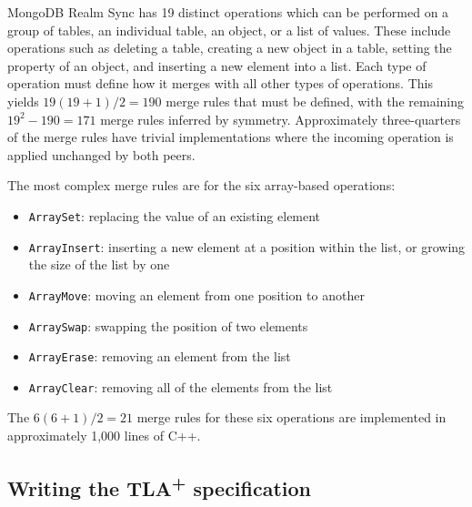 \documentclass{vldb}
\begin{document}

MongoDB Realm Sync has 19 distinct operations which can be performed on a group of tables, an individual table, an object, or a list of values. These include operations such as deleting a table, creating a new object in a table, setting the property of an object, and inserting a new element into a list. Each type of operation must define how it merges with all other types of operations. This yields $19 (19 + 1) / 2 = 190$ merge rules that must be defined, with the remaining $19^2 - 190 = 171$ merge rules inferred by symmetry. Approximately three-quarters of the merge rules have trivial implementations where the incoming operation is applied unchanged by both peers.

The most complex merge rules are for the six array-based operations:

\begin{itemize}[itemsep=-0.5ex]
  \item \texttt{ArraySet}: replacing the value of an existing element
  \item \texttt{ArrayInsert}: inserting a new element at a position within the list, or growing the size of the list by one
  \item \texttt{ArrayMove}: moving an element from one position to another
  \item \texttt{ArraySwap}: swapping the position of two elements
  \item \texttt{ArrayErase}: removing an element from the list
  \item \texttt{ArrayClear}: removing all of the elements from the list
\end{itemize}

The $6 (6 + 1) / 2 = 21$ merge rules for these six operations are implemented in approximately 1,000 lines of C++.

\subsection{Writing the TLA\textsuperscript{+} specification}
\label{subsec:mbtcg_tlaplus}
\end{document}
